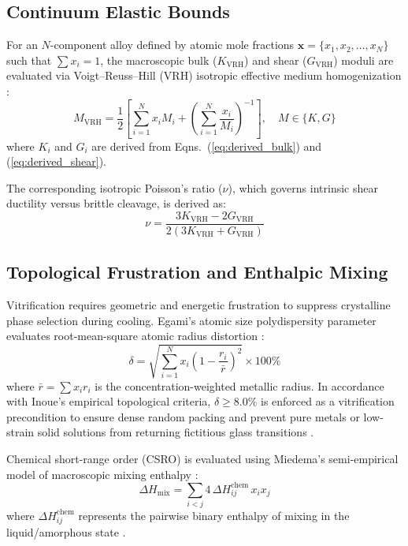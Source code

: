 \documentclass[aps,prmaterials,reprint,superscriptaddress,amsmath,amssymb,floatfix]{revtex4-2}
\begin{document}
\subsection{Continuum Elastic Bounds}
For an $N$-component alloy defined by atomic mole fractions $\mathbf{x} = \{x_1, x_2, \dots, x_N\}$ such that $\sum x_i = 1$, the macroscopic bulk ($K_{\text{VRH}}$) and shear ($G_{\text{VRH}}$) moduli are evaluated via Voigt--Reuss--Hill (VRH) isotropic effective medium homogenization \cite{Voigt1910,Reuss1929,Hill1952}:
\begin{equation}
M_{\text{VRH}} = \frac{1}{2} \left[ \sum_{i=1}^N x_i M_i + \left( \sum_{i=1}^N \frac{x_i}{M_i} \right)^{-1} \right], \quad M \in \{K, G\}
\label{eq:vrh}
\end{equation}
where $K_i$ and $G_i$ are derived from Eqns.~(\ref{eq:derived_bulk}) and (\ref{eq:derived_shear}).

The corresponding isotropic Poisson's ratio ($\nu$), which governs intrinsic shear ductility versus brittle cleavage, is derived as:
\begin{equation}
\nu = \frac{3K_{\text{VRH}} - 2G_{\text{VRH}}}{2(3K_{\text{VRH}} + G_{\text{VRH}})}
\label{eq:poisson}
\end{equation}

\subsection{Topological Frustration and Enthalpic Mixing}
Vitrification requires geometric and energetic frustration to suppress crystalline phase selection during cooling. Egami's atomic size polydispersity parameter evaluates root-mean-square atomic radius distortion \cite{Egami1984,Egami1997,Inoue2000Acta}:
\begin{equation}
\delta = \sqrt{\sum_{i=1}^N x_i \left( 1 - \frac{r_i}{\bar{r}} \right)^2} \times 100\%
\label{eq:egami}
\end{equation}
where $\bar{r} = \sum x_i r_i$ is the concentration-weighted metallic radius. In accordance with Inoue's empirical topological criteria, $\delta \ge 8.0\%$ is enforced as a vitrification precondition to ensure dense random packing and prevent pure metals or low-strain solid solutions from returning fictitious glass transitions \cite{Egami1984,Inoue2000Acta}.

Chemical short-range order (CSRO) is evaluated using Miedema's semi-empirical model of macroscopic mixing enthalpy \cite{Miedema1988}:
\begin{equation}
\Delta H_{\text{mix}} = \sum_{i < j} 4 \, \Delta H_{ij}^{\text{chem}} \, x_i x_j
\label{eq:miedema}
\end{equation}
where $\Delta H_{ij}^{\text{chem}}$ represents the pairwise binary enthalpy of mixing in the liquid/amorphous state \cite{Takeuchi2005}.
\end{document}
